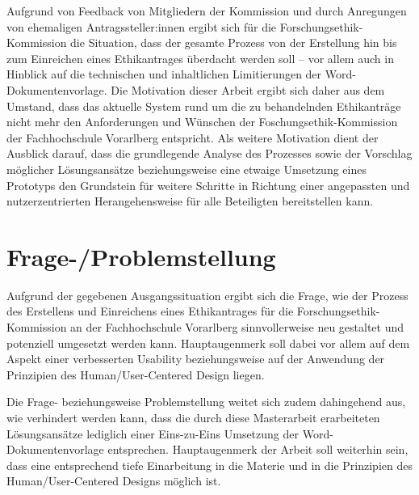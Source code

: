 \documentclass[a4paper,12pt,twoside]{scrreprt}
\begin{document}
\medskip

Aufgrund von Feedback von Mitgliedern der Kommission und durch Anregungen von ehemaligen Antragssteller:innen ergibt sich für die Forschungsethik-Kommission die Situation, dass der gesamte Prozess von der Erstellung hin bis zum Einreichen eines Ethikantrages überdacht werden soll -- vor allem auch in Hinblick auf die technischen und inhaltlichen Limitierungen der Word-Dokumentenvorlage. Die Motivation dieser Arbeit ergibt sich daher aus dem Umstand, dass das aktuelle System rund um die zu behandelnden Ethikanträge nicht mehr den Anforderungen und Wünschen der Foschungsethik-Kommission der Fachhochschule Vorarlberg entspricht. Als weitere Motivation dient der Ausblick darauf, dass die grundlegende Analyse des Prozesses sowie der Vorschlag möglicher Lösungsansätze beziehungsweise eine etwaige Umsetzung eines Prototyps den Grundstein für weitere Schritte in Richtung einer angepassten und nutzerzentrierten Herangehensweise für alle Beteiligten bereitstellen kann. 

\section{Frage-/Problemstellung}
\label{sec:frage-problemstellung}

Aufgrund der gegebenen Ausgangssituation ergibt sich die Frage, wie der Prozess des Erstellens und Einreichens eines Ethikantrages für die Forschungsethik-Kommission an der Fachhochschule Vorarlberg sinnvollerweise neu gestaltet und potenziell umgesetzt werden kann. Hauptaugenmerk soll dabei vor allem auf dem Aspekt einer verbesserten Usability beziehungsweise auf der Anwendung der Prinzipien des Human/User-Centered Design liegen.

Die Frage- beziehungsweise Problemstellung weitet sich zudem dahingehend aus, wie verhindert werden kann, dass die durch diese Masterarbeit erarbeiteten Lösungsansätze lediglich einer Eins-zu-Eins Umsetzung der Word-Dokumentenvorlage entsprechen. Hauptaugenmerk der Arbeit soll weiterhin sein, dass eine entsprechend tiefe Einarbeitung in die Materie und in die Prinzipien des Human/User-Centered Designs möglich ist.

\medskip
\end{document}
